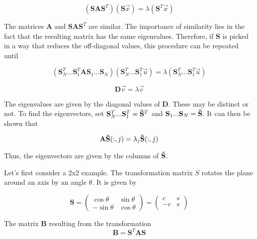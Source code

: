 \documentclass[a4paper,11pt]{article}
\begin{document}
\begin{equation}\label{eq:8}
(\mathbf S \mathbf A \mathbf S^T) (\mathbf S \vec{x}) = \lambda (\mathbf S^T \vec{x})
\end{equation}

The matrices $\mathbf A$ and $\mathbf S \mathbf A \mathbf S^T$ are similar. The importance of similarity lies in the fact that the resulting matrix has the same eigenvalues. Therefore, if $\mathbf S$ is picked in a way that reduces the off-diagonal values, this procedure can be repeated until 

\begin{equation}\label{eq:9}
(\mathbf S_N^T...\mathbf S_1^T \mathbf A \mathbf S_1 ... \mathbf S_N) (\mathbf S_N^T...\mathbf S_1^T \vec{u}) = \lambda (\mathbf S_N^T...\mathbf S_1^T \vec{u})
\end{equation}

\begin{equation}\label{eq:10}
\mathbf D \vec{v} = \lambda \vec{v}
\end{equation}

The eigenvalues are given by the diagonal values of $\mathbf D$. These may be distinct or not. To find the eigenvectors, set $\mathbf S_N^T...\mathbf S_1^T = \mathbf{\Tilde{S}}^T$ and $\mathbf S_1 ... \mathbf S_N = \mathbf{\Tilde{S}}$. It can then be shown that \cite{matrix}

\begin{equation}\label{eq:11}
\mathbf A \mathbf{\Tilde{S}}(:,j) = \lambda_j \mathbf{\Tilde{S}}(:,j)
\end{equation}

Thus, the eigenvectors are given by the columns of $\mathbf{\Tilde{S}}$.

Let's first consider a 2x2 example. The transformation matrix $S$ rotates the plane around an axis by an angle $\theta$. It is given by

\begin{equation}\label{eq:12}
\mathbf S =
\begin{pmatrix}
\cos\theta & \sin\theta \\
-\sin\theta & \cos\theta 
\end{pmatrix}
= 
\begin{pmatrix}
c & s \\
-c & s \\
\end{pmatrix}
\end{equation}

The matrix $\mathbf{B}$ resulting from the transformation
\begin{equation}\label{eq:13}
    \mathbf{B} = \mathbf{S}^T \mathbf A \mathbf S
\end{equation}
\end{document}
